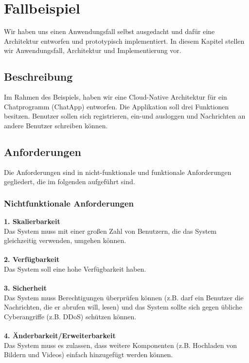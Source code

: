 \chapter{Fallbeispiel}
Wir haben uns einen Anwendungsfall selbst ausgedacht und dafür eine Architektur entworfen und prototypisch implementiert. In diesem Kapitel stellen wir Anwendungsfall, Architektur und Implementierung vor.

\section{Beschreibung}
Im Rahmen des Beispiels, haben wir eine Cloud-Native Architektur für ein Chatprogramm (ChatApp) entworfen. Die Applikation soll drei Funktionen besitzen. Benutzer sollen sich registrieren, ein-und ausloggen und Nachrichten an andere Benutzer schreiben können.

\section{Anforderungen}
Die Anforderungen sind in nicht-funktionale und funktionale Anforderungen gegliedert, die im folgenden aufgeführt sind.
\subsection{Nichtfunktionale Anforderungen}
\textbf{1. Skalierbarkeit}\\
Das System muss mit einer großen Zahl von Benutzern, die das System gleichzeitig verwenden, umgehen können.\\
\\
\textbf{2. Verfügbarkeit}\\
Das System soll eine hohe Verfügbarkeit haben.\\
\\
\textbf{3. Sicherheit}\\
Das System muss Berechtigungen überprüfen können (z.B. darf ein Benutzer die Nachrichten, die er abrufen will, lesen) und das System sollte sich gegen übliche Cyberangriffe (z.B. DDoS) schützen können.\\
\\
\textbf{4. Änderbarkeit/Erweiterbarkeit}\\
Das System muss es zulassen, dass weitere Komponenten (z.B. Hochladen von Bildern und Videos) einfach hinzugefügt werden können.

